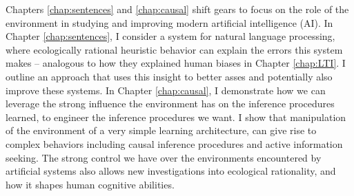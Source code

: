 Chapters \ref{chap:sentences} and \ref{chap:causal} shift gears to focus on the role of the environment in studying and improving modern artificial intelligence (AI).  In Chapter \ref{chap:sentences}, I consider a system for natural language processing, where ecologically rational heuristic behavior can explain the errors this system makes -- analogous to how they explained human biases in Chapter \ref{chap:LTI}. I outline an approach that uses this insight to better asses and potentially also improve these systems. In Chapter \ref{chap:causal}, I demonstrate how we can leverage the strong influence the environment has on the inference procedures learned, to engineer the inference procedures we want. I show that manipulation of the environment of a very simple learning architecture, can give rise to complex behaviors including causal inference procedures and active information seeking. The strong control we have over the environments encountered by artificial systems also allows new investigations into ecological rationality, and how it shapes human cognitive abilities.